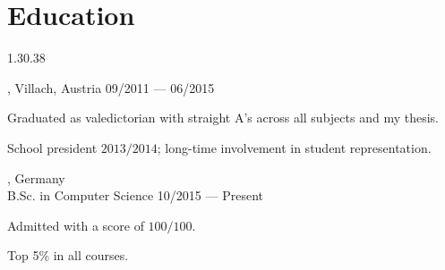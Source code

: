 \section{Education}{1.3}{0.38}
\begin{entry}
	{, Villach, Austria}{}
	{09/2011 --- 06/2015}
	\item Graduated as valedictorian with straight A's across all subjects and my thesis.
	\item School president $2013/2014$; long-time involvement in student representation.
\end{entry}
\begin{entry}
	{, Germany}
	{\\B.Sc. in Computer Science}
	{10/2015 --- Present}
	\item Admitted with a score of $100/100$.
  \item Top 5\% in all courses.
\end{entry}


